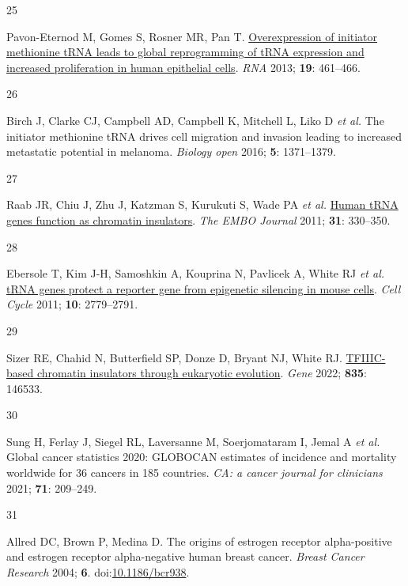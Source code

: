 \documentclass[
  12pt,
]{article}
\newlength{\cslhangindent}
\newlength{\csllabelwidth}
\newlength{\cslentryspacingunit} %
\newenvironment{CSLReferences}[2] %
 {%
  \setlength{\parindent}{0pt}
  \ifodd #1
  \let\oldpar\par
  \def\par{\hangindent=\cslhangindent\oldpar}
  \fi
  \setlength{\parskip}{#2\cslentryspacingunit}
 }%
 {}
\newcommand{\CSLLeftMargin}[1]{\parbox[t]{\csllabelwidth}{#1}}
\newcommand{\CSLRightInline}[1]{\parbox[t]{\linewidth - \csllabelwidth}{#1}\break}
\begin{document}
\begin{CSLReferences}{0}{0}
\leavevmode{}%
\CSLLeftMargin{25 }%
\CSLRightInline{Pavon-Eternod M, Gomes S, Rosner MR, Pan T. \href{https://doi.org/10.1261/rna.037507.112}{Overexpression of initiator methionine tRNA leads to global reprogramming of tRNA expression and increased proliferation in human epithelial cells}. \emph{RNA} 2013; \textbf{19}: 461--466.}

\leavevmode{}%
\CSLLeftMargin{26 }%
\CSLRightInline{Birch J, Clarke CJ, Campbell AD, Campbell K, Mitchell L, Liko D \emph{et al.} The initiator methionine {tRNA} drives cell migration and invasion leading to increased metastatic potential in melanoma. \emph{Biology open} 2016; \textbf{5}: 1371--1379.}

\leavevmode{}%
\CSLLeftMargin{27 }%
\CSLRightInline{Raab JR, Chiu J, Zhu J, Katzman S, Kurukuti S, Wade PA \emph{et al.} \href{https://doi.org/10.1038/emboj.2011.406}{Human tRNA genes function as chromatin insulators}. \emph{The EMBO Journal} 2011; \textbf{31}: 330--350.}

\leavevmode{}%
\CSLLeftMargin{28 }%
\CSLRightInline{Ebersole T, Kim J-H, Samoshkin A, Kouprina N, Pavlicek A, White RJ \emph{et al.} \href{https://doi.org/10.4161/cc.10.16.17092}{tRNA genes protect a reporter gene from epigenetic silencing in mouse cells}. \emph{Cell Cycle} 2011; \textbf{10}: 2779--2791.}

\leavevmode{}%
\CSLLeftMargin{29 }%
\CSLRightInline{Sizer RE, Chahid N, Butterfield SP, Donze D, Bryant NJ, White RJ. \href{https://doi.org/10.1016/j.gene.2022.146533}{TFIIIC-based chromatin insulators through eukaryotic evolution}. \emph{Gene} 2022; \textbf{835}: 146533.}

\leavevmode{}%
\CSLLeftMargin{30 }%
\CSLRightInline{Sung H, Ferlay J, Siegel RL, Laversanne M, Soerjomataram I, Jemal A \emph{et al.} Global cancer statistics 2020: {GLOBOCAN} estimates of incidence and mortality worldwide for 36 cancers in 185 countries. \emph{CA: a cancer journal for clinicians} 2021; \textbf{71}: 209--249.}

\leavevmode{}%
\CSLLeftMargin{31 }%
\CSLRightInline{Allred DC, Brown P, Medina D. The origins of estrogen receptor alpha-positive and estrogen receptor alpha-negative human breast cancer. \emph{Breast Cancer Research} 2004; \textbf{6}. doi:\href{https://doi.org/10.1186/bcr938}{10.1186/bcr938}.}


\end{CSLReferences}
\end{document}
